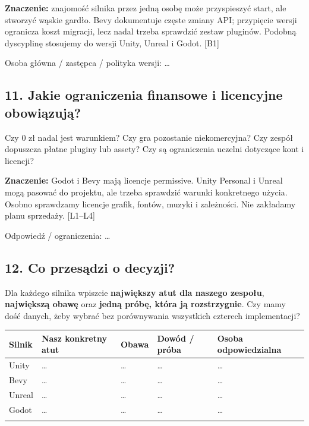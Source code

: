 \documentclass[10pt,a4paper]{article}
\begin{document}
\textbf{Znaczenie:} znajomość silnika przez jedną osobę może przyspieszyć start, ale stworzyć wąskie gardło. Bevy dokumentuje częste zmiany API; przypięcie wersji ogranicza koszt migracji, lecz nadal trzeba sprawdzić zestaw pluginów. Podobną dyscyplinę stosujemy do wersji Unity, Unreal i Godot. [B1]



Osoba główna / zastępca / polityka wersji: …



\subsection*{11. Jakie ograniczenia finansowe i licencyjne obowiązują?}


Czy 0 zł nadal jest warunkiem? Czy gra pozostanie niekomercyjna? Czy zespół dopuszcza płatne pluginy lub assety? Czy są ograniczenia uczelni dotyczące kont i licencji?



\textbf{Znaczenie:} Godot i Bevy mają licencje permissive. Unity Personal i Unreal mogą pasować do projektu, ale trzeba sprawdzić warunki konkretnego użycia. Osobno sprawdzamy licencje grafik, fontów, muzyki i zależności. Nie zakładamy planu sprzedaży. [L1–L4]



Odpowiedź / ograniczenia: …



\subsection*{12. Co przesądzi o decyzji?}


Dla każdego silnika wpiszcie \textbf{największy atut dla naszego zespołu}, \textbf{największą obawę} oraz \textbf{jedną próbę, która ją rozstrzygnie}. Czy mamy dość danych, żeby wybrać bez porównywania wszystkich czterech implementacji?



{\scriptsize\setlength{\tabcolsep}{2mm}\begin{longtable}{>{\raggedright\arraybackslash}p{18.48mm}>{\raggedright\arraybackslash}p{29.26mm}>{\raggedright\arraybackslash}p{33.88mm}>{\raggedright\arraybackslash}p{44.66mm}>{\raggedright\arraybackslash}p{27.72mm}}
\toprule \textbf{Silnik} & \textbf{Nasz konkretny atut} & \textbf{Obawa} & \textbf{Dowód / próba} & \textbf{Osoba odpowiedzialna} \\ \midrule\endhead
Unity & … & … & … & … \\ \addlinespace[2pt]
Bevy & … & … & … & … \\ \addlinespace[2pt]
Unreal & … & … & … & … \\ \addlinespace[2pt]
Godot & … & … & … & … \\ \addlinespace[2pt]
\bottomrule\end{longtable}}
\end{document}
